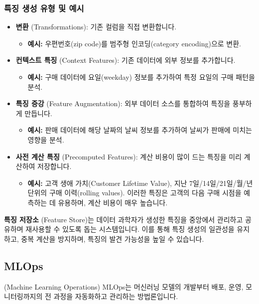 \documentclass[11pt,a4paper]{article}
\theoremstyle{definition}
\begin{document}
\subsubsection*{특징 생성 유형 및 예시}
\begin{itemize}
    \item \textbf{변환} (Transformations): 기존 컬럼을 직접 변환합니다.
    \begin{itemize}
        \item \textbf{예시:} 우편번호(zip code)를 범주형 인코딩(category encoding)으로 변환.
    \end{itemize}
    \item \textbf{컨텍스트 특징} (Context Features): 기존 데이터에 외부 정보를 추가합니다.
    \begin{itemize}
        \item \textbf{예시:} 구매 데이터에 요일(weekday) 정보를 추가하여 특정 요일의 구매 패턴을 분석.
    \end{itemize}
    \item \textbf{특징 증강} (Feature Augmentation): 외부 데이터 소스를 통합하여 특징을 풍부하게 만듭니다.
    \begin{itemize}
        \item \textbf{예시:} 판매 데이터에 해당 날짜의 날씨 정보를 추가하여 날씨가 판매에 미치는 영향을 분석.
    \end{itemize}
    \item \textbf{사전 계산 특징} (Precomputed Features): 계산 비용이 많이 드는 특징을 미리 계산하여 저장합니다.
    \begin{itemize}
        \item \textbf{예시:} 고객 생애 가치(Customer Lifetime Value), 지난 7일/14일/21일/월/년 단위의 구매 이력(rolling values). 이러한 특징은 고객의 다음 구매 시점을 예측하는 데 유용하며, 계산 비용이 매우 높습니다.
    \end{itemize}
\end{itemize}

\begin{tcolorbox}[summarybox={특징 저장소 (Feature Store)}]
\textbf{특징 저장소} (Feature Store)는 데이터 과학자가 생성한 특징을 중앙에서 관리하고 공유하며 재사용할 수 있도록 돕는 시스템입니다. 이를 통해 특징 생성의 일관성을 유지하고, 중복 계산을 방지하며, 특징의 발견 가능성을 높일 수 있습니다.
\end{tcolorbox}

\subsection*{MLOps} (Machine Learning Operations)
MLOps는 머신러닝 모델의 개발부터 배포, 운영, 모니터링까지의 전 과정을 자동화하고 관리하는 방법론입니다.
\end{document}
